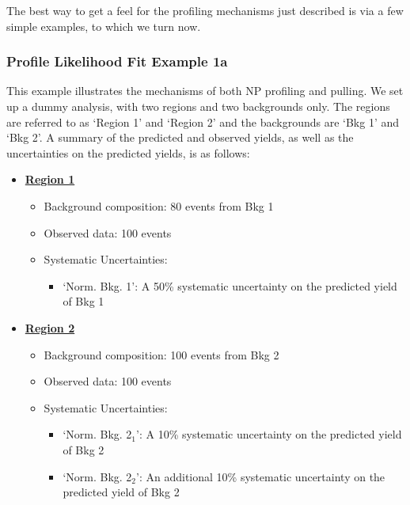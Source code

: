 The best way to get a feel for the profiling mechanisms just described is via a few simple
examples, to which we turn now.

\subsubsection{Profile Likelihood Fit Example 1a}
\label{sec:profiling_example_1a}

This example illustrates the mechanisms of both NP profiling and pulling.
We set up a dummy analysis, with two regions and two backgrounds only.
The regions are referred to as `Region 1' and `Region 2' and the backgrounds
are `Bkg 1' and `Bkg 2'.
A summary of the predicted and observed yields, as well as the uncertainties on
the predicted yields, is as follows:

\begin{itemize}
    \item \underline{\textbf{Region 1}}
        \begin{itemize}
            \item Background composition: 80 events from Bkg 1
            \item Observed data: 100 events
            \item Systematic Uncertainties:
            \begin{itemize}
                \item `Norm. Bkg. 1': A 50\% systematic uncertainty on the predicted yield of Bkg 1
            \end{itemize}
        \end{itemize}
    \item \underline{\textbf{Region 2}}
        \begin{itemize}
            \item Background composition: 100 events from Bkg 2
            \item Observed data: 100 events
            \item Systematic Uncertainties:
            \begin{itemize}
                \item `Norm. Bkg. 2$_1$': A 10\% systematic uncertainty on the predicted yield of Bkg 2
                \item `Norm. Bkg. 2$_2$': An additional 10\% systematic uncertainty on the predicted yield of Bkg 2
            \end{itemize}
        \end{itemize}
\end{itemize}

